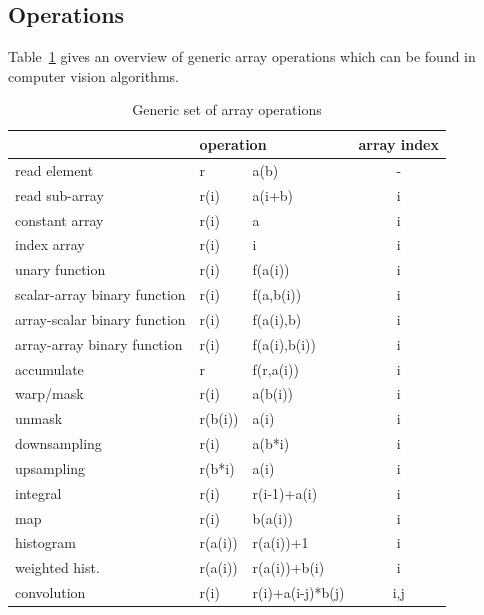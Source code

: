 \documentclass[12pt,a4paper,oneside,openright]{book}
\newcommand{\tbl}[1]{Table~\ref{tbl:#1}}
\begin{document}
\begin{CJK}{UTF8}{}
\section{Operations}\label{cha:operations}
\tbl{generic} gives an overview of generic array operations which can be found in computer vision algorithms.
\begin{table}[t]
  \begin{center}
    \caption{Generic set of array operations\label{tbl:generic}}
    \begin{tabular}{ll@{=}lc}\toprule
      & \multicolumn{2}{l}{operation} & array index\\\midrule
      read element                 & r       & a(b)             & -\\
      read sub-array               & r(i)    & a(i+b)           & i\\
      constant array               & r(i)    & a                & i\\
      index array                  & r(i)    & i                & i\\
      unary function               & r(i)    & f(a(i))          & i\\
      scalar-array binary function & r(i)    & f(a,b(i))        & i\\
      array-scalar binary function & r(i)    & f(a(i),b)        & i\\
      array-array binary function  & r(i)    & f(a(i),b(i))     & i\\
      accumulate                   & r       & f(r,a(i))        & i\\
      warp/mask                    & r(i)    & a(b(i))          & i\\
      unmask                       & r(b(i)) & a(i)             & i\\
      downsampling                 & r(i)    & a(b*i)           & i\\
      upsampling                   & r(b*i)  & a(i)             & i\\
      integral                     & r(i)    & r(i-1)+a(i)      & i\\
      map                          & r(i)    & b(a(i))          & i\\
      histogram                    & r(a(i)) & r(a(i))+1        & i\\
      weighted hist.               & r(a(i)) & r(a(i))+b(i)     & i\\
      convolution                  & r(i)    & r(i)+a(i-j)*b(j) & i,j\\\bottomrule

\end{tabular}
\end{center}
\end{table}
\end{CJK}
\end{document}
